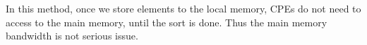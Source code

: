 \documentclass[oribibl]{llncs}
\newcommand{\icarus}{Icarus}
\newcommand{\aap}{Astronomy \& Astrophysics}
\newcommand{\aj}{The Astronomical Journal}
\newcommand{\apj}{The Astrophysical Journal}
\newcommand{\apjl}{The Astrophysical Journal Letters}
\newcommand{\mnras}{Monthly Notices of the Royal Astronomical Society}
\newcommand{\nat}{Nature}
\newcommand{\pasj}{Publications of the Astronomical Society of Japan}
\begin{document}
In this method, once we store elements to the local memory, CPEs do
not need to access to the main memory, until the sort is done. Thus
the main memory bandwidth is not serious issue.


  
  


  
  

  




  
  
\end{document}

